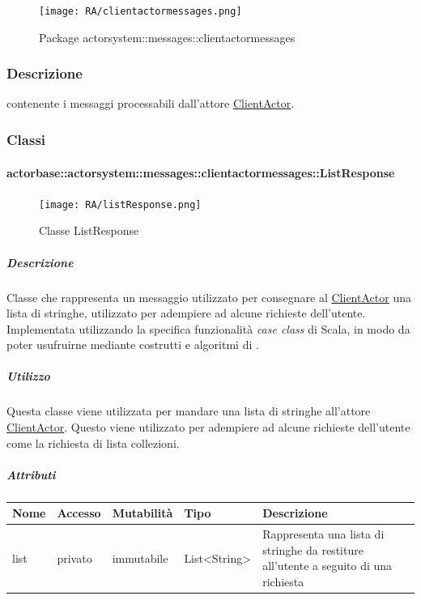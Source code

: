 \documentclass{scalatekids-article}
\begin{document}
\begin{figure}[H]
  \begin{center}
    \texttt{[image: RA/clientactormessages.png]}
    \caption{Package actorsystem::messages::clientactormessages}
  \end{center}
\end{figure}

\subsubsection{Descrizione}
 contenente i messaggi processabili dall'attore \hyperref[sec:actorbase::actorsystem::actors::clientactor::ClientActor]{ClientActor}.

\subsubsection{Classi}

\paragraph{actorbase::actorsystem::messages::clientactormessages::ListResponse}
\label{sec:actorbase::actorsystem::messages::clientactormessages::ListResponse}

\begin{figure}[H]
  \begin{center}
    \texttt{[image: RA/listResponse.png]}
    \caption{Classe ListResponse}
  \end{center}
\end{figure}

\subparagraph{Descrizione}
Classe che rappresenta un messaggio utilizzato per consegnare al
\hyperref[sec:actorbase::actorsystem::actors::clientactor::ClientActor]{ClientActor} una lista di stringhe, utilizzato per adempiere ad alcune
richieste dell'utente.\\Implementata utilizzando la specifica funzionalità \textit{case class} di Scala,
in modo da poter usufruirne mediante costrutti e algoritmi di
.

\subparagraph{Utilizzo}
Questa classe viene utilizzata per mandare una lista di stringhe all'attore
\hyperref[sec:actorbase::actorsystem::actors::clientactor::ClientActor]{ClientActor}.
Questo viene utilizzato per adempiere ad alcune richieste dell'utente come
la richiesta di lista collezioni.

\subparagraph{Attributi}
\begin{tabular}{| p{2cm} | p{1.5cm} | p{2cm} | p{3cm} | p{8.5cm} |}
  \hline
  Nome & Accesso & Mutabilità & Tipo & Descrizione\\
  \hline
  list & privato & immutabile & List<String> & Rappresenta una lista di stringhe da restiture all'utente a seguito di una richiesta \\
  \hline
\end{tabular}
\end{document}
